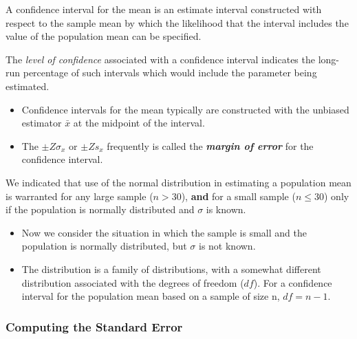 \documentclass[]{report}
\begin{document}
{{%

A confidence interval for the
mean is an estimate interval constructed with respect to the sample mean by which the likelihood that the interval
includes the value of the population mean can be specified.

The \emph{level of confidence} associated with a confidence interval indicates the long-run percentage
of such intervals which would include the parameter being estimated.


\begin{itemize}
\item Confidence intervals for the mean typically are constructed with the unbiased estimator $\bar{x}$ at the midpoint
of the interval.

\item The $\pm Z \sigma_x$ or $\pm Z s_x$ frequently is called the \textbf{\emph{margin of error}} for the confidence interval.
\end{itemize}


We indicated that use of the normal distribution in estimating a population mean is warranted
for any large sample ($n > 30$), \textbf{and} for a small sample ($n \leq 30$) only if the population is normally distributed
and $\sigma$ is known.


\begin{itemize}
\item Now we consider the situation in which the sample is small and the population is normally distributed,
but $\sigma$ is not known.
\item The distribution is a family of distributions, with
a somewhat different distribution associated with the degrees of freedom ($df$). For a confidence interval for the
population mean based on a sample of size n, $df = n - 1$.
\end{itemize}

{

\subsubsection{Computing the Standard Error}

}}}
\end{document}
